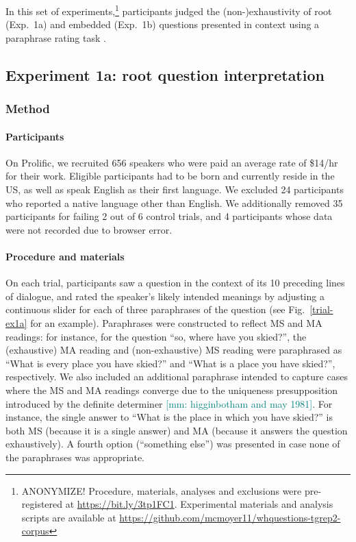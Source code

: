 \documentclass[12pt,letterpaper,table,svgnames,dvipsnames]{article}
\newcommand{\mm}[1]{\textcolor{teal}{[mm: #1]}}
\newcommand{\figref}[1]{Fig.~\ref{#1}}
\begin{document}
In this set of experiments,\footnote{\color{red}ANONYMIZE! Procedure, materials, analyses and exclusions were pre-registered at \url{https://bit.ly/3tp1FC1}. Experimental materials and analysis scripts are available at \url{https://github.com/mcmoyer11/whquestions-tgrep2-corpus}\color{black}}  participants judged the (non-)exhaustivity of root (Exp.~1a) and embedded (Exp.~1b) questions presented in context using a paraphrase rating task \cite{degen2015}.


\subsection{Experiment 1a: root question interpretation}

\subsubsection{Method}

\paragraph{Participants}

On Prolific, we recruited 656 speakers who were paid an average rate of \$14/hr for their work. Eligible participants had to be born and currently reside in the US, as well as speak English as their first language. We excluded 24 participants who reported a native language other than English. We additionally removed 35 participants for failing 2 out of 6 control trials, and 4 participants whose data were not recorded due to browser error.

\paragraph{Procedure and materials}
On each trial, participants saw a  question in the context of its 10 preceding lines of dialogue, and rated  the speaker's likely intended meanings by adjusting a continuous slider for each of three paraphrases of the question (see \figref{trial-ex1a} for an example).  Paraphrases were constructed to reflect MS and MA readings: for instance, for the question ``so, where have you skied?'', the (exhaustive) MA reading and (non-exhaustive) MS reading were paraphrased as ``What is every place you have skied?'' and ``What is a place you have skied?'', respectively. We also included an additional paraphrase intended to capture cases where the MS and MA readings converge due to the uniqueness presupposition introduced by the definite determiner \cite{dayal1996}\mm{higginbotham and may 1981}. For instance, the single answer to ``What is the place in which you have skied?'' is both MS (because it is a single answer) and MA (because it answers the question exhaustively). A fourth option (``something else'') was presented in case none of the paraphrases was appropriate. 
\end{document}
